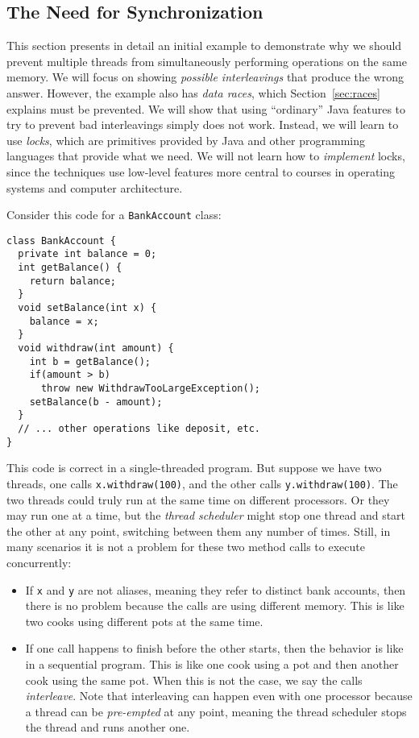 \documentclass[10pt]{article}
\begin{document}
\subsection{The Need for Synchronization}

This section presents in detail an initial example to demonstrate why
we should prevent multiple threads from simultaneously performing
operations on the same memory.  We will focus on showing
\emph{possible interleavings} that produce the wrong answer.  However,
the example also has \emph{data races}, which Section~\ref{sec:races}
explains must be prevented.  We will show that using ``ordinary'' Java
features to try to prevent bad interleavings simply does not work.
Instead, we will learn to use \emph{locks}, which are primitives
provided by Java and other programming languages that provide what
we need.  We will not learn how to \emph{implement} locks, since the
techniques use low-level features more central to courses in operating
systems and computer architecture.

Consider this code for a {\tt BankAccount} class:
\begin{verbatim}
class BankAccount {
  private int balance = 0;
  int getBalance() { 
    return balance; 
  }
  void setBalance(int x) { 
    balance = x; 
  } 
  void withdraw(int amount) {
    int b = getBalance();
    if(amount > b)
      throw new WithdrawTooLargeException();
    setBalance(b - amount);
  }
  // ... other operations like deposit, etc.
}
\end{verbatim}

This code is correct in a single-threaded program.  But suppose we
have two threads, one calls {\tt x.withdraw(100)}, and the other calls
{\tt y.withdraw(100)}.  The two threads could truly run at the same
time on different processors.  Or they may run one at a time, but the
\emph{thread scheduler} might stop one thread and start the other at
any point, switching between them any number of times.  Still, in many
scenarios it is not a problem for these two method calls to execute concurrently:
\begin{itemize}
\item If {\tt x} and {\tt y} are not aliases, meaning they refer to
  distinct bank accounts, then there is no problem because the calls
  are using different memory.  This is like two cooks using different
  pots at the same time.
\item If one call happens to finish before the other starts, then the behavior
  is like in a sequential program.  This is like one cook using a pot
  and then another cook using the same pot.  When this is not the
  case, we say the calls \emph{interleave}.  Note that interleaving
  can happen even with one processor because a thread can be
  \emph{pre-empted} at any point, meaning the thread scheduler stops
  the thread and runs another one.
\end{itemize}
\end{document}
